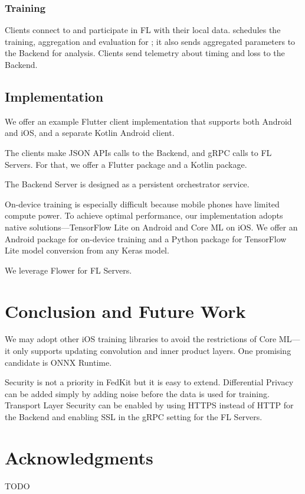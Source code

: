 \documentclass[letterpaper]{article} %
\begin{document}
\subsubsection{Training}
Clients connect to \fs{} and participate in FL with their local data.
\fs{} schedules the training, aggregation and evaluation for \model;
it also sends aggregated parameters to the Backend for analysis.
Clients send telemetry about timing and loss to the Backend.

\subsection{Implementation}

We offer an example Flutter client implementation that supports both Android and
iOS, and a separate Kotlin Android client.

The clients make JSON APIs calls to the Backend,
and gRPC calls to FL Servers.
For that, we offer a Flutter package and a Kotlin package.

The Backend Server is designed as a persistent orchestrator service.

On-device training is especially difficult because mobile phones have limited
compute power.
To achieve optimal performance, our implementation adopts native
solutions---TensorFlow Lite on Android and Core ML on iOS.
We offer an Android package for on-device training and a Python package for
TensorFlow Lite model conversion from any Keras model.

We leverage Flower \cite{beutel2020flower} for FL Servers.

\section{Conclusion and Future Work}


We may adopt other iOS training libraries to avoid the restrictions of Core
ML---it only supports updating convolution and inner product layers.
One promising candidate is ONNX Runtime.

Security is not a priority in FedKit but it is easy to extend.
Differential Privacy can be added simply by adding noise before the data is
used for training.
Transport Layer Security can be enabled by
using HTTPS instead of HTTP for the Backend and
enabling SSL in the gRPC setting for the FL Servers.

\appendix

\section*{Acknowledgments}
TODO

\bigskip


\end{document}
